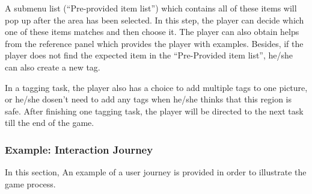 A submenu list (``Pre-provided item list'') which contains all of these items will pop up after the area has been selected.
In this step,
the player can decide which one of these items matches and then choose it.
The player can also obtain helps from the reference panel which provides the player with examples.
Besides, 
if the player does not find the expected item in the ``Pre-Provided item list'',
he/she can also create a new tag.

In a tagging task,
the player also has a choice to add multiple tags to one picture,
or he/she dosen't need to add any tags when he/she thinks that this region is safe.
After finishing one tagging task, 
the player will be directed to the next task till the end of the game.

\subsubsection{Example: Interaction Journey}
In this section,
An example of a user journey is provided in order to illustrate the game process.

